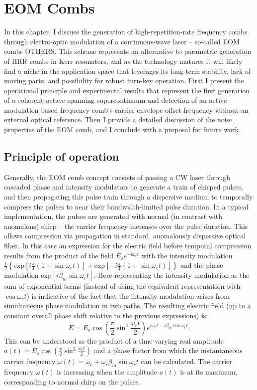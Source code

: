  \chapter{EOM Combs}

In this chapter, I discuss the generation of high-repetition-rate frequency combs through electro-optic modulation of a continuous-wave laser – so-called EOM combs \cite{Metcalf2013}\color{red}OTHERS\color{black}. This scheme represents an alternative to parametric generation of HRR combs in Kerr resonators, and as the technology matures it will likely find a niche in the application space that leverages its long-term stability, lack of moving parts, and possibility for robust turn-key operation. First I present the operational principle and experimental results that represent the first generation of a coherent octave-spanning supercontinuum and detection of an active-modulation-based frequency comb’s carrier-envelope offset frequency without an external optical reference. Then I provide a detailed discussion of the noise properties of the EOM comb, and I conclude with a proposal for future work.

\section{Principle of operation}
Generally, the EOM comb concept consists of passing a CW laser through cascaded phase and intensity modulators to generate a train of chirped pulses, and then propagating this pulse train through a dispersive medium to temporally compress the pulses to near their bandwidth-limited pulse duration. In a typical implementation, the pulses are generated with normal (in contrast with anomalous) chirp – the carrier frequency increases over the pulse duration. This allows compression via propagation in standard, anomalously dispersive optical fiber. In this case an expression for the electric field before temporal compression results from the product of the field $E_oe^{-i\omega_ct}$ with the intensity modulation $\frac{1}{2}\left\{\mathrm{exp}\left[i\frac{\pi}{4}(1+\sin{\omega_rt})\right]+\mathrm{exp}\left[-i\frac{\pi}{4}(1+\sin{\omega_rt})\right]\right\}$ and the phase modulation $\mathrm{exp}\left[i\beta_m \sin{\omega_r t}\right]$. Here representing the intensity modulation as the sum of exponential terms (instead of using the equivalent representation with $\cos{\omega_rt}$) is indicative of the fact  that the intensity modulation arises from simultaneous phase modulation in two paths. The resulting electric field (up to a constant overall phase shift relative to the previous expressions) is:
\begin{equation}
E=E_o\cos\left(\frac{\pi}{2}\sin^2{\frac{\omega_rt}{2}}\right)e^{i\omega_ct-i\beta_m\cos{\omega_rt}}.
\end{equation}
This can be understood as the product of a time-varying real amplitude $a(t)=E_o\cos\left(\frac{\pi}{2}\sin^2{\frac{\omega_rt}{2}}\right)$ and a phase factor from which the instantaneous carrier frequency $\omega(t)=\omega_c+\omega_r\beta_m\sin{\omega_rt}$ can be calculated. The carrier frequency $\omega(t)$ is increasing when the amplitude $a(t)$ is at its maximum, corresponding to normal chirp on the pulses.

